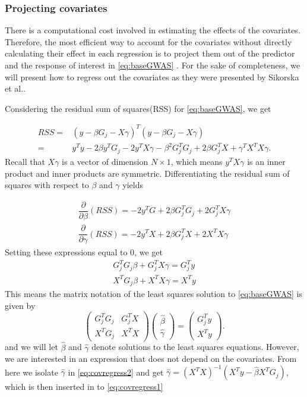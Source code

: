 \subsubsection{Projecting covariates}
There is a computational cost involved in estimating the effects of the covariates. Therefore, the most efficient way to account for the covariates without directly calculating their effect in each regression is to project them out of the predictor and the response of interest in \cref{eq:baseGWAS} \cite{sikorska2013gwas}. For the sake of completeness, we will present how to regress out the covariates as they were presented by Sikorska et al.\cite{sikorska2013gwas}. 

Considering the residual sum of squares(RSS) for \cref{eq:baseGWAS}, we get 

\begin{align}
	RSS =& \left( y - \beta G_j - X\gamma \right)^T\left( y - \beta G_j - X\gamma \right) \\
	=& y^T y - 2\beta y^T G_j - 2y^TX\gamma - \beta^2 G_j^TG_j + 2\beta G_j^T X + \gamma^T X^T X \gamma.
\end{align}
Recall that $ X\gamma $ is a vector of dimension $ N \times 1 $, which means $ y^T X \gamma $ is an inner product and inner products are symmetric. Differentiating the residual sum of squares with respect to $ \beta $ and $ \gamma $ yields

\begin{align}
	\dfrac{\partial}{\partial \beta} (RSS) = -2y^TG + 2\beta G_j^TG_j + 2G_j^T X\gamma \\
	\dfrac{\partial}{\partial \gamma} (RSS)  = -2y^TX + 2\beta G^T_j X + 2X^TX\gamma 
\end{align}
Setting these expressions equal to $ 0 $, we get
\begin{align}
	G_j^T G_j \beta +  G_j^T X \gamma =  G_j^T y  \label{eq:covregress1}\\ 
	X^T G_j \beta + X^T X \gamma =  X^Ty \label{eq:covregress2}
\end{align}
This means the matrix notation of the least squares solution to \cref{eq:baseGWAS} is given by 
\begin{equation}
	\begin{pmatrix}
		G_j^T G_j & G_j^T X \\
		X^T G_j & X^T X
	\end{pmatrix}
	\begin{pmatrix}
		\hat{\beta} \\
		\hat{\gamma}
	\end{pmatrix} = 
	\begin{pmatrix}
		G_j^T y \\
		X^T y
	\end{pmatrix}.
\end{equation}
and we will let $ \hat{\beta} $ and $ \hat{\gamma} $ denote solutions to the least squares equations. However, we are interested in an expression that does not depend on the covariates. From here we isolate $ \hat{\gamma} $ in \cref{eq:covregress2} and get $ \hat{\gamma} = (X^TX)^{-1}(X^Ty - \hat{\beta} X^TG_j) $, which is then inserted in to \cref{eq:covregress1} 

